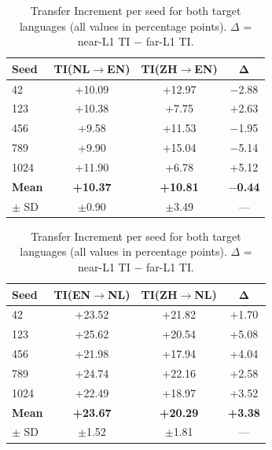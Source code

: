 \documentclass[11pt]{article}
\begin{document}
\begin{table}[H]
\centering
\footnotesize
\setlength{\tabcolsep}{4pt}
\begin{tabular}{lccc}
\hline
\textbf{Seed} & \textbf{TI(NL$\rightarrow$EN)} & \textbf{TI(ZH$\rightarrow$EN)} & $\boldsymbol{\Delta}$ \\ \hline
42   & +10.09 & +12.97 & $-$2.88 \\
123  & +10.38 & +7.75  & +2.63 \\
456  & +9.58  & +11.53 & $-$1.95 \\
789  & +9.90  & +15.04 & $-$5.14 \\
1024 & +11.90 & +6.78  & +5.12 \\ \hline
\textbf{Mean} & \textbf{+10.37} & \textbf{+10.81} & \textbf{$-$0.44} \\
$\pm$ SD & $\pm$0.90 & $\pm$3.49 & --- \\ \hline
\end{tabular}

\vspace{4pt}

\begin{tabular}{lccc}
\hline
\textbf{Seed} & \textbf{TI(EN$\rightarrow$NL)} & \textbf{TI(ZH$\rightarrow$NL)} & $\boldsymbol{\Delta}$ \\ \hline
42   & +23.52 & +21.82 & +1.70 \\
123  & +25.62 & +20.54 & +5.08 \\
456  & +21.98 & +17.94 & +4.04 \\
789  & +24.74 & +22.16 & +2.58 \\
1024 & +22.49 & +18.97 & +3.52 \\ \hline
\textbf{Mean} & \textbf{+23.67} & \textbf{+20.29} & \textbf{+3.38} \\
$\pm$ SD & $\pm$1.52 & $\pm$1.81 & --- \\ \hline
\end{tabular}
\caption{Transfer Increment per seed for both target languages (all values in percentage points). $\Delta$ = near-L1 TI $-$ far-L1 TI.}
\label{tab:ti-detail}
\end{table}
\end{document}
